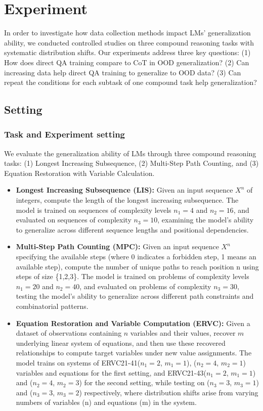

\section{Experiment}

In order to investigate how data collection methods impact LMs' generalization ability, we conducted controlled studies on three compound reasoning tasks with systematic distribution shifts. Our experiments address three key questions: (1) How does direct QA training compare to CoT in OOD generalization? (2) Can increasing data help direct QA training to generalize to OOD data? (3) Can repeat the conditions for each subtask of one compound task help generalization?
\subsection{Setting}
\subsubsection{Task and Experiment setting}
We evaluate the generalization ability of LMs through three compound reasoning tasks: (1) Longest Increasing Subsequence, (2) Multi-Step Path Counting, and (3) Equation Restoration with Variable Calculation. 
\begin{itemize}
    \item \textbf{Longest Increasing Subsequence (LIS):} Given an input sequence $X^n$ of integers, compute the length of the longest increasing subsequence. The model is trained on sequences of complexity levels $n_1=4$ and $n_2=16$, and evaluated on sequences of complexity $n_3=10$, examining the model's ability to generalize across different sequence lengths and positional dependencies.
    
    \item \textbf{Multi-Step Path Counting (MPC):} Given an input sequence $X^n$ specifying the available steps (where 0 indicates a forbidden step, 1 means an available step), compute the number of unique paths to reach position n using steps of size \{1,2,3\}. The model is trained on problems of complexity levels $n_1=20$ and $n_2=40$, and evaluated on problems of complexity $n_3=30$, testing the model's ability to generalize across different path constraints and combinatorial patterns.
    
    \item \textbf{Equation Restoration and Variable Computation (ERVC):} Given a dataset of observations containing $n$ variables and their values, recover $m$ underlying linear system of equations, and then use these recovered relationships to compute target variables under new value assignments. The model trains on systems of ERVC21-41($n_1=2$, $m_1=1$), ($n_2=4$, $m_2=1$) variables and equations for the first setting, and ERVC21-43($n_1=2$, $m_1=1$) and ($n_2=4$, $m_2=3$) for the second setting, while testing on ($n_3=3$, $m_3=1$) and ($n_3=3$, $m_3=2$) respectively, where distribution shifts arise from varying numbers of variables (n) and equations (m) in the system.
    
\end{itemize}

